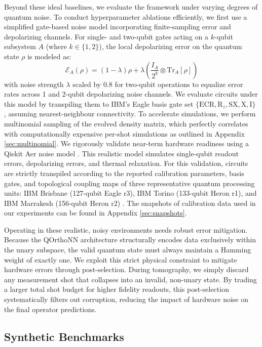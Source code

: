 \documentclass{iopjournal}
\begin{document}
Beyond these ideal baselines, we evaluate the framework under varying degrees of quantum noise. To conduct hyperparameter ablations efficiently, we first use a simplified gate-based noise model incorporating finite-sampling error and depolarizing channels. For single- and two-qubit gates acting on a $k$-qubit subsystem $A$ (where $k \in \{1, 2\}$), the local depolarizing error on the quantum state $\rho$ is modeled as:
\[\mathcal{E}_A(\rho) = (1-\lambda)\rho + \lambda \left( \frac{I_A}{2^k} \otimes \text{Tr}_A[\rho] \right)\]
with noise strength $\lambda$ scaled by 0.8 for two-qubit operations to equalize error rates across 1 and 2-qubit depolarizing noise channels. We evaluate circuits under this model by transpiling them to IBM's Eagle basis gate set $\{\mathrm{ECR}, \mathrm{R}_z, \mathrm{SX}, \mathrm{X}, \mathrm{I}\}$ \cite{abughanem2025eagle, xiao2025qdon}, assuming nearest-neighbour connectivity. To accelerate simulations, we perform multinomial sampling of the evolved density matrix, which perfectly correlates with computationally expensive per-shot simulations as outlined in Appendix \ref{sec:multinomial}. We rigorously validate near-term hardware readiness using a Qiskit Aer noise model \cite{qiskit2024}. This realistic model simulates single-qubit readout errors, depolarizing errors, and thermal relaxation. For this validation, circuits are strictly transpiled according to the reported calibration parameters, basis gates, and topological coupling maps of three representative quantum processing units: IBM Brisbane (127-qubit Eagle r3), IBM Torino (133-qubit Heron r1), and IBM Marrakesh (156-qubit Heron r2) \cite{IBMQuantumComputers}. The snapshots of calibration data used in our experiments can be found in Appendix \ref{sec:snapshots}.

Operating in these realistic, noisy environments needs robust error mitigation. Because the QOrthoNN architecture structurally encodes data exclusively within the unary subspace, the valid quantum state must always maintain a Hamming weight of exactly one. We exploit this strict physical constraint to mitigate hardware errors through post-selection. During tomography, we simply discard any measurement shot that collapses into an invalid, non-unary state. By trading a larger total shot budget for higher fidelity readouts, this post-selection systematically filters out corruption, reducing the impact of hardware noise on the final operator predictions.


\subsection{Synthetic Benchmarks}
\end{document}
